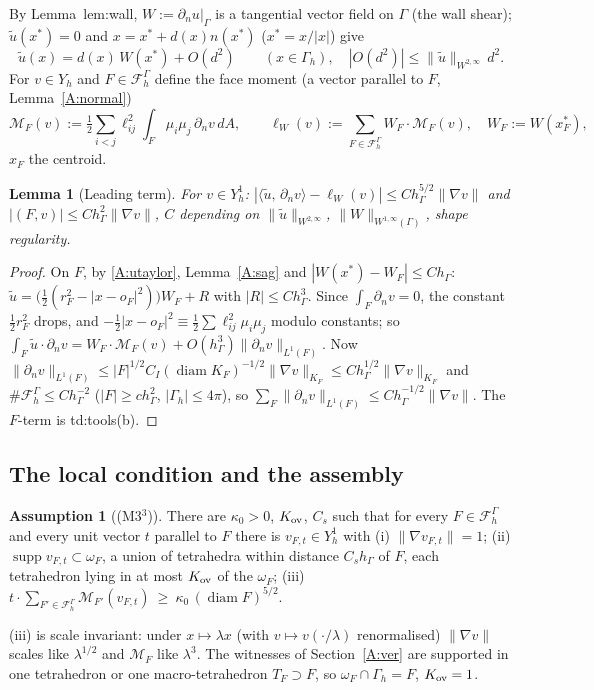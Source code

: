 \documentclass[11pt]{article}
\newtheorem{lemma}[theorem]{Lemma}
\theoremstyle{definition}
\newtheorem{assumption}[theorem]{Assumption}
\newcommand{\hG}{h_\Gamma}
\newcommand{\Gh}{\Gamma_h}
\newcommand{\FG}{\mathcal F_h^\Gamma}
\newcommand{\dn}{\partial_n}
\newcommand{\ut}{\tilde u}
\newcommand{\ip}[2]{\langle #1,\, #2\rangle}
\newcommand{\norm}[1]{\lVert #1\rVert}
\newcommand{\M}{\mathcal M}
\DeclareMathOperator{\diam}{diam}
\begin{document}
By Lemma~lem:wall, $W:=\dn u|_\Gamma$ is a tangential vector field on $\Gamma$ (the wall shear); $\ut(x^\ast)=0$ and $x=x^\ast+d(x)n(x^\ast)$ ($x^\ast=x/|x|$) give
\begin{equation}\label{A:utaylor}
\ut(x)=d(x)\,W(x^\ast)+O(d^2)\qquad(x\in\Gh),\quad |O(d^2)|\le\norm{\ut}_{W^{2,\infty}}\,d^2 .
\end{equation}
For $v\in Y_h$ and $F\in\FG$ define the face moment (a vector parallel to $F$, Lemma~\ref{A:normal})
\[
\M_F(v):=\tfrac12\sum_{i<j}\ell_{ij}^2\int_F\mu_i\mu_j\,\dn v\,dA,\qquad \ell_W(v):=\sum_{F\in\FG}W_F\cdot\M_F(v),\quad W_F:=W(x_F^\ast),
\]
$x_F$ the centroid.

\begin{lemma}[Leading term]\label{A:lead}
For $v\in Y_h^1$: $|\ip{\ut}{\dn v}-\ell_W(v)|\le C\hG^{5/2}\norm{\nabla v}$ and $|(F,v)|\le C\hG^2\norm{\nabla v}$, $C$ depending on $\norm{\ut}_{W^{2,\infty}}$, $\norm W_{W^{1,\infty}(\Gamma)}$, shape regularity.
\end{lemma}
\begin{proof}
On $F$, by \eqref{A:utaylor}, Lemma~\ref{A:sag} and $|W(x^\ast)-W_F|\le C\hG$: $\ut=\bigl(\tfrac12(r_F^2-|x-o_F|^2)\bigr)W_F+R$ with $|R|\le C\hG^3$. Since $\int_F\dn v=0$, the constant $\frac12r_F^2$ drops, and $-\frac12|x-o_F|^2\equiv\frac12\sum\ell^2_{ij}\mu_i\mu_j$ modulo constants; so $\int_F\ut\cdot\dn v=W_F\cdot\M_F(v)+O(\hG^3)\norm{\dn v}_{L^1(F)}$. Now $\norm{\dn v}_{L^1(F)}\le|F|^{1/2}C_I(\diam K_F)^{-1/2}\norm{\nabla v}_{K_F}\le C\hG^{1/2}\norm{\nabla v}_{K_F}$ and $\#\FG\le C\hG^{-2}$ ($|F|\ge c\hG^2$, $|\Gh|\le4\pi$), so $\sum_F\norm{\dn v}_{L^1(F)}\le C\hG^{-1/2}\norm{\nabla v}$. The $F$-term is td:tools(b).
\end{proof}

\subsection{The local condition and the assembly}
\begin{assumption}[(M3$^3$)]\label{A:M3}
There are $\kappa_0>0$, $K_{\rm ov}$, $C_s$ such that for every $F\in\FG$ and every unit vector $t$ parallel to $F$ there is $v_{F,t}\in Y_h^1$ with (i) $\norm{\nabla v_{F,t}}=1$; (ii) $\operatorname{supp}v_{F,t}\subset\omega_F$, a union of tetrahedra within distance $C_s\hG$ of $F$, each tetrahedron lying in at most $K_{\rm ov}$ of the $\omega_F$; (iii) $t\cdot\sum_{F'\in\FG}\M_{F'}(v_{F,t})\ \ge\ \kappa_0\,(\diam F)^{5/2}$.
\end{assumption}
(iii) is scale invariant: under $x\mapsto\lambda x$ (with $v\mapsto v(\cdot/\lambda)$ renormalised) $\norm{\nabla v}$ scales like $\lambda^{1/2}$ and $\M_F$ like $\lambda^3$. The witnesses of Section~\ref{A:ver} are supported in one tetrahedron or one macro-tetrahedron $T_F\supset F$, so $\omega_F\cap\Gh=F$, $K_{\rm ov}=1$.
\end{document}
